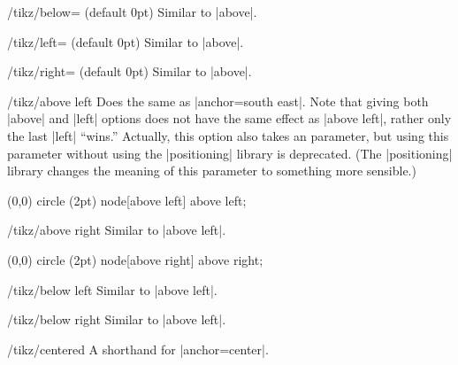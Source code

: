 \begin{key}{/tikz/below= (default 0pt)}
  Similar to |above|.
\end{key}

\begin{key}{/tikz/left= (default 0pt)}
  Similar to |above|.
\end{key}

\begin{key}{/tikz/right= (default 0pt)}
  Similar to |above|.
\end{key}

\begin{key}{/tikz/above left}
  Does the same as |anchor=south east|. Note that giving both |above|
  and |left| options does not have the same effect as |above left|,
  rather only the last |left| ``wins.'' Actually, this option also
  takes an  parameter, but using this parameter without
  using the |positioning| library is deprecated. (The |positioning|
  library changes the meaning of this parameter to something more
  sensible.)
\begin{codeexample}[]
\tikz \fill (0,0) circle (2pt) node[above left] {above left};
\end{codeexample}
\end{key}

\begin{key}{/tikz/above right}
  Similar to  |above left|.
\begin{codeexample}[]
\tikz \fill (0,0) circle (2pt) node[above right] {above right};
\end{codeexample}
\end{key}

\begin{key}{/tikz/below left}
  Similar to |above left|.
\end{key}
\begin{key}{/tikz/below right}
  Similar to |above left|.
\end{key}

\begin{key}{/tikz/centered}
  A shorthand for |anchor=center|. 
\end{key}

